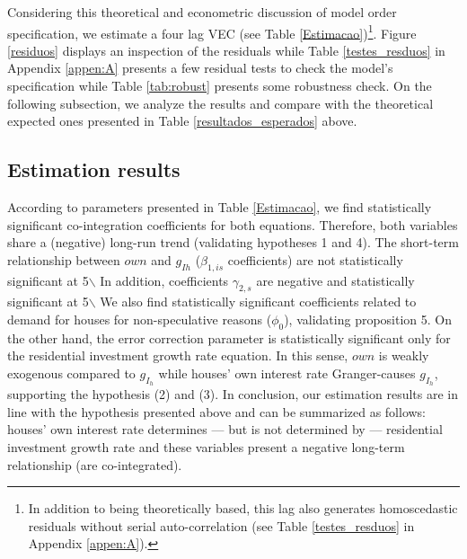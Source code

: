 \documentclass[11pt]{article}
\begin{document}
Considering this theoretical and econometric discussion of model order specification, we estimate a four lag VEC  (see Table \ref{Estimacao})\footnote{In addition to being theoretically based, this lag also generates homoscedastic residuals without serial auto-correlation (see Table \ref{testes_resduos} in Appendix \ref{appen:A}).}. 
Figure \ref{residuos} displays an inspection of the residuals while Table \ref{testes_resduos} in Appendix \ref{appen:A} presents a few residual tests to check the model's specification while Table \ref{tab:robust} presents some robustness check.
On the following subsection, we analyze the results and compare with the theoretical expected ones presented in Table \ref{resultados_esperados} above.  




\subsection{Estimation results}
\label{sec:org1a3f091}
\label{sec:results}

According to parameters presented in Table \ref{Estimacao}, we find statistically significant co-integration  coefficients for both equations. 
Therefore, both variables share a (negative) long-run trend (validating hypotheses 1 and 4).
The short-term relationship between \(own\) and \(g_{Ih}\) (\(\beta_{1, is}\) coefficients) are not statistically significant at 5$\backslash$%
In addition, coefficients \(\gamma_{2,s}\) are negative and statistically significant at 5$\backslash$%
We also find statistically significant coefficients related to demand for houses for non-speculative reasons (\(\phi_0\)), validating proposition 5.
On the other hand, the error correction parameter is statistically significant only for the residential investment growth rate equation.
In this sense, \(own\) is weakly exogenous compared to \(g_{I_h}\) while houses' own interest rate Granger-causes \(g_{I_h}\), supporting the hypothesis (2) and (3).
In conclusion, our estimation results are in line with the hypothesis presented above and can be summarized as follows: houses' own interest rate determines --- but is not determined by --- residential investment growth rate and these variables present a negative long-term relationship (are co-integrated).
\end{document}
